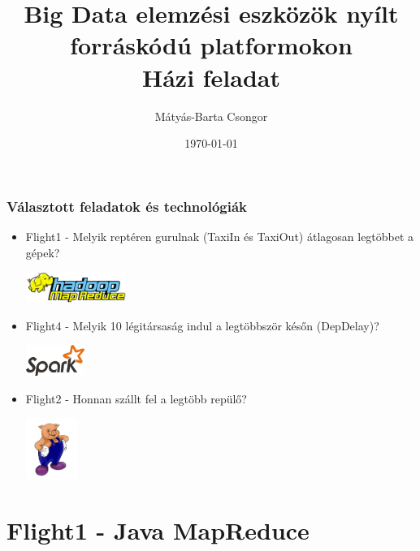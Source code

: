 \documentclass{beamer}
\title[Big Data elemzési eszközök nyílt forráskódú platformokon]{Big Data elemzési eszközök nyílt forráskódú platformokon\\ Házi feladat} %
\author{Mátyás-Barta Csongor} %
\institute[BME] %
{
VYW0YR\\
mbcsongor@yahoo.com \\%
}
\date{\today} %
\begin{document}
\begin{frame}[plain]
\titlepage %
\end{frame}

\begin{frame}
\frametitle{Választott feladatok és technológiák} 	
	\begin{itemize}
		\item Flight1 - Melyik reptéren gurulnak (TaxiIn és TaxiOut) átlagosan legtöbbet a gépek? 
			\begin{center}
				\includegraphics[height=1cm]{figures/mapreduce}
			\end{center}			
		\item Flight4 - Melyik 10 légitársaság indul a legtöbbször későn (DepDelay)?
			\begin{center}
				\includegraphics[height=1cm]{figures/spark}
			\end{center}	
		\item Flight2 - Honnan szállt fel a legtöbb repülő? 
			\begin{center}
				\includegraphics[height=2cm]{figures/pig}
			\end{center}	
	\end{itemize}
\end{frame}

\section{Flight1 - Java MapReduce} %
\end{document}
